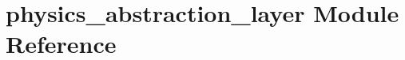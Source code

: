 \section{physics\+\_\+abstraction\+\_\+layer Module Reference}
\label{namespacephysics__abstraction__layer}
